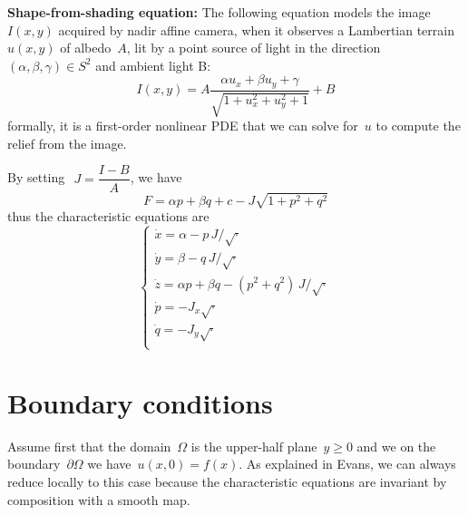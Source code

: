 {\bf Shape-from-shading equation:}
The following equation models the image~$I(x,y)$ acquired by nadir affine
camera, when it observes a Lambertian terrain~$u(x,y)$ of albedo~$A$, lit by
a point source of light in the direction~$\left(\alpha,\beta,\gamma\right)\in
S^2$ and ambient light B:
\[
	I(x,y)=A\frac{\alpha u_x+\beta u_y+\gamma}{\sqrt{1+u_x^2+u_y^2+1}}+B
\]
formally, it is a first-order nonlinear PDE that we can solve for~$u$ to
compute the relief from the image.

By setting~$ \ J=\dfrac{I-B}A$, we have
\[
	F = \alpha p + \beta q + c - J\sqrt{1+p^2+q^2}
\]
thus the characteristic equations are
\[
	\begin{cases}
		\dot x = \alpha - p\,J/\sqrt{\cdot} \\
		\dot y = \beta - q\,J/\sqrt{\cdot} \\
		\dot z = \alpha p + \beta q - (p^2+q^2)\,J/\sqrt{\cdot}\\
		\dot p = -J_x\sqrt{\cdot} \\
		\dot q = -J_y\sqrt{\cdot} \\
	\end{cases}
\]


\clearpage
\section{Boundary conditions}

Assume first that the domain~$\Omega$ is the upper-half plane~$y\ge 0$ and we
on the boundary~$\partial\Omega$ we have~$u(x,0)=f(x)$.
As explained in Evans, we can always reduce locally  to this case because the
characteristic equations are invariant by composition with a smooth map.

